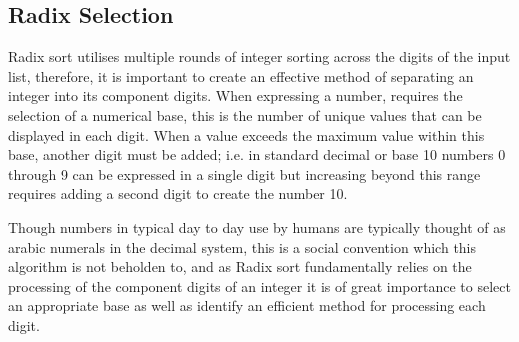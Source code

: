 \documentclass[12pt]{article}
\begin{document}
	\subsection{Radix Selection}
	
	\label{sec:radixselection}
	Radix sort utilises multiple rounds of integer sorting across the digits of the input list, therefore, it is important to create an effective method of separating an integer into its component digits. When expressing a number, requires the selection of a numerical base, this is the number of unique values that can be displayed in each digit. When a value exceeds the maximum value within this base, another digit must be added; i.e. in standard decimal or base 10 numbers 0 through 9 can be expressed in a single digit but increasing beyond this range requires adding a second digit to create the number 10.
	\par
	Though numbers in typical day to day use by humans are typically thought of as arabic numerals in the decimal system, this is a social convention which this algorithm is not beholden to, and as Radix sort fundamentally relies on the processing of the component digits of an integer it is of great importance to select an appropriate base as well as identify an efficient method for processing each digit.
\end{document}
